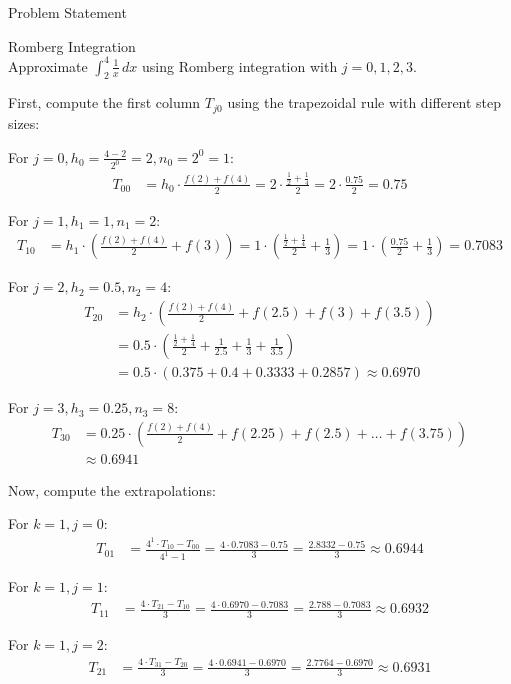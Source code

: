 \begin{concept}{Problem Statement}
\begin{example2}{Romberg Integration}\\
Approximate $\int_2^4 \frac{1}{x} \, dx$ using Romberg integration with $j = 0, 1, 2, 3$.

First, compute the first column $T_{j0}$ using the trapezoidal rule with different step sizes:

For $j = 0, h_0 = \frac{4-2}{2^0} = 2, n_0 = 2^0 = 1$:
\begin{align*}
T_{00} &= h_0 \cdot \frac{f(2) + f(4)}{2} = 2 \cdot \frac{\frac{1}{2} + \frac{1}{4}}{2} = 2 \cdot \frac{0.75}{2} = 0.75
\end{align*}

For $j = 1, h_1 = 1, n_1 = 2$:
\begin{align*}
T_{10} &= h_1 \cdot \left(\frac{f(2) + f(4)}{2} + f(3)\right) = 1 \cdot \left(\frac{\frac{1}{2} + \frac{1}{4}}{2} + \frac{1}{3}\right) = 1 \cdot \left(\frac{0.75}{2} + \frac{1}{3}\right) = 0.7083
\end{align*}

For $j = 2, h_2 = 0.5, n_2 = 4$:
\begin{align*}
T_{20} &= h_2 \cdot \left(\frac{f(2) + f(4)}{2} + f(2.5) + f(3) + f(3.5)\right)\\
&= 0.5 \cdot \left(\frac{\frac{1}{2} + \frac{1}{4}}{2} + \frac{1}{2.5} + \frac{1}{3} + \frac{1}{3.5}\right)\\
&= 0.5 \cdot (0.375 + 0.4 + 0.3333 + 0.2857) \approx 0.6970
\end{align*}

For $j = 3, h_3 = 0.25, n_3 = 8$:
\begin{align*}
T_{30} &= 0.25 \cdot \left(\frac{f(2) + f(4)}{2} + f(2.25) + f(2.5) + \ldots + f(3.75)\right)\\
&\approx 0.6941
\end{align*}

Now, compute the extrapolations:

For $k = 1, j = 0$:
\begin{align*}
T_{01} &= \frac{4^1 \cdot T_{10} - T_{00}}{4^1 - 1} = \frac{4 \cdot 0.7083 - 0.75}{3} = \frac{2.8332 - 0.75}{3} \approx 0.6944
\end{align*}

For $k = 1, j = 1$:
\begin{align*}
T_{11} &= \frac{4 \cdot T_{21} - T_{10}}{3} = \frac{4 \cdot 0.6970 - 0.7083}{3} = \frac{2.788 - 0.7083}{3} \approx 0.6932
\end{align*}

For $k = 1, j = 2$:
\begin{align*}
T_{21} &= \frac{4 \cdot T_{31} - T_{20}}{3} = \frac{4 \cdot 0.6941 - 0.6970}{3} = \frac{2.7764 - 0.6970}{3} \approx 0.6931
\end{align*}


\end{example2}
\end{concept}
